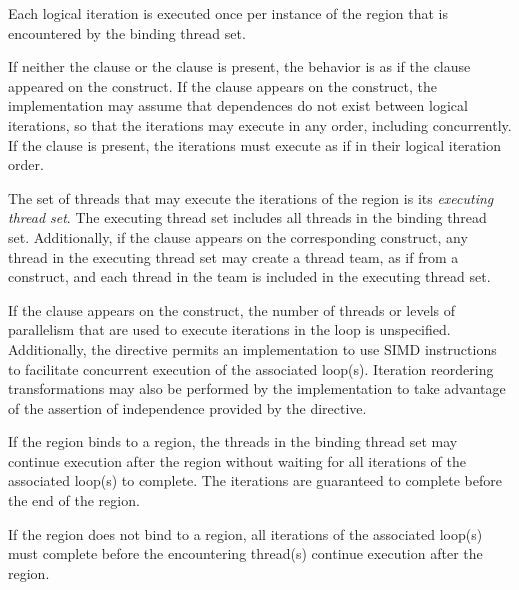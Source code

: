 Each logical iteration is executed once per instance of the 
region that is encountered by the binding thread set.

If neither the  clause or the  clause is present, the
behavior is as if the  clause appeared on the construct.  If the
 clause appears on the  construct, the implementation 
may assume that dependences do not exist between logical iterations, so that
the iterations may execute in any order, including concurrently. If the
 clause is present, the iterations must execute as if in their
logical iteration order.

The set of threads that may execute the iterations of the  region
is its \emph{executing thread set}. The executing thread set includes all
threads in the binding thread set. Additionally, if the  clause
appears on the corresponding construct, any thread in the executing
thread set may create a thread team, as if from a  construct,
and each thread in the team is included in the executing thread set.

\begin{note}
If the  clause appears on the  construct, the number of
threads or levels of parallelism that are used to execute iterations in the
loop is unspecified. Additionally, the directive permits an implementation to
use SIMD instructions to facilitate concurrent execution of the associated
loop(s). Iteration reordering transformations may also be performed by
the implementation to take advantage of the assertion of independence provided
by the directive.
\end{note}

If the  region binds to a  region, the threads in the
binding thread set may continue execution after the  region without
waiting for all iterations of the associated loop(s) to complete. The
iterations are guaranteed to complete before the end of the 
region. 

If the  region does not bind to a  region, all
iterations of the associated loop(s) must complete before the encountering
thread(s) continue execution after the  region.





